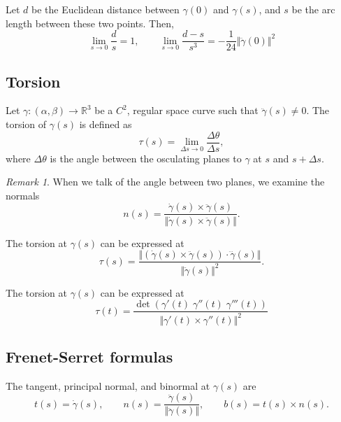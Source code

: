 \documentclass[11pt]{article}
\newcommand{\R}{\mathbb{R}}
\newcommand{\norm}[1]{\Vert #1 \Vert}
\theoremstyle{definition}
\theoremstyle{remark}
\newtheorem*{remark}{Remark}
\numberwithin{equation}{section}
\begin{document}
    \begin{lemma}
        Let $d$ be the Euclidean distance between $\gamma(0)$ and $\gamma(s)$, and
        $s$ be the arc length between these two points. Then, \[
            \lim_{s \to 0} \frac{d}{s} = 1, \qquad \lim_{s \to 0} \frac{d - s}{s^3} =
            -\frac{1}{24}\norm{\ddot{\gamma}(0)}^2
        \] 
    \end{lemma}


    \subsection{Torsion}

    \begin{definition}
        Let $\gamma\colon (\alpha, \beta) \to \R^3$ be a $C^2$, regular space curve
        such that $\ddot{\gamma}(s) \neq 0$. The torsion of $\gamma(s)$ is defined as
        \[
            \tau(s) = \lim_{\Delta s \to 0} \frac{\Delta \theta}{\Delta s},
        \] where $\Delta \theta$ is the angle between the osculating planes to
        $\gamma$ at $s$ and $s + \Delta s$.

        \begin{remark}
            When we talk of the angle between two planes, we examine the normals \[
                n(s) = \frac{\dot{\gamma}(s) \times
                \ddot{\gamma}(s)}{\norm{\dot{\gamma}(s) \times \ddot{\gamma}(s)}}.
            \] 
        \end{remark}
    \end{definition}
    \begin{lemma}
        The torsion at $\gamma(s)$ can be expressed at \[
            \tau(s) = \frac{\norm{(\dot{\gamma}(s) \times \ddot{\gamma}(s))\cdot
            \dddot{\gamma}(s)}}{\norm{\ddot{\gamma}(s)}^2}.
        \] 
    \end{lemma}
    \begin{lemma}
        The torsion at $\gamma(s)$ can be expressed at \[
            \tau(t) = \frac{\det(\gamma'(t)\; \gamma''(t)\;
            \gamma'''(t))}{\norm{\gamma'(t) \times \gamma''(t)}^2}
        \] 
    \end{lemma}


    \subsection{Frenet-Serret formulas}

    \begin{definition}
        The tangent, principal normal, and binormal at $\gamma(s)$ are \[
            t(s) = \dot{\gamma}(s), \qquad
            n(s) = \frac{\ddot{\gamma}(s)}{\norm{\ddot{\gamma}(s)}}, \qquad
            b(s) = t(s) \times n(s).
        \] 
    \end{definition}
\end{document}
